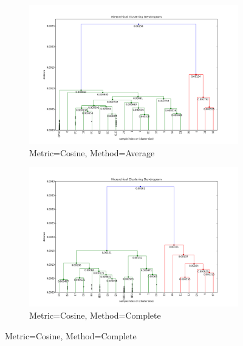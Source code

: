 \begin{figure}[H] 
\begin{subfigure}{0.48\textwidth}
\includegraphics[width=\linewidth]{figs/Dendrogram/dendrogram-average-cosine}
\caption{Metric=Cosine, Method=Average} \label{fig:Dendrogram_all_single_a}
\end{subfigure}\hspace*{\fill}
\begin{subfigure}{0.48\textwidth}
\includegraphics[width=\linewidth]{figs/Dendrogram/dendrogram-complete-cosine}
\caption{Metric=Cosine, Method=Complete} \label{fig:Dendrogram_all_single_b}
\end{subfigure}


\end{figure}
